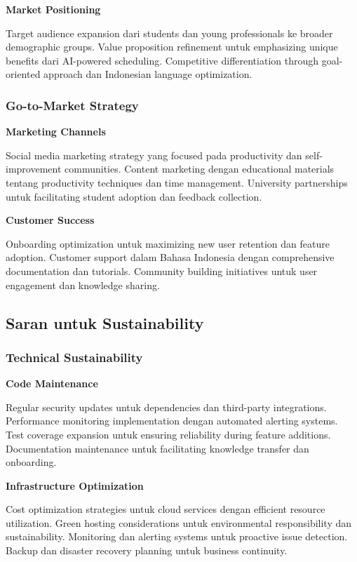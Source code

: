 \textbf{Market Positioning}

Target audience expansion dari students dan young professionals ke broader demographic groups. Value proposition refinement untuk emphasizing unique benefits dari AI-powered scheduling. Competitive differentiation through goal-oriented approach dan Indonesian language optimization.

\subsubsection{Go-to-Market Strategy}

\textbf{Marketing Channels}

Social media marketing strategy yang focused pada productivity dan self-improvement communities. Content marketing dengan educational materials tentang productivity techniques dan time management. University partnerships untuk facilitating student adoption dan feedback collection.

\textbf{Customer Success}

Onboarding optimization untuk maximizing new user retention dan feature adoption. Customer support dalam Bahasa Indonesia dengan comprehensive documentation dan tutorials. Community building initiatives untuk user engagement dan knowledge sharing.

\subsection{Saran untuk Sustainability}

\subsubsection{Technical Sustainability}

\textbf{Code Maintenance}

Regular security updates untuk dependencies dan third-party integrations. Performance monitoring implementation dengan automated alerting systems. Test coverage expansion untuk ensuring reliability during feature additions. Documentation maintenance untuk facilitating knowledge transfer dan onboarding.

\textbf{Infrastructure Optimization}

Cost optimization strategies untuk cloud services dengan efficient resource utilization. Green hosting considerations untuk environmental responsibility dan sustainability. Monitoring dan alerting systems untuk proactive issue detection. Backup dan disaster recovery planning untuk business continuity.

